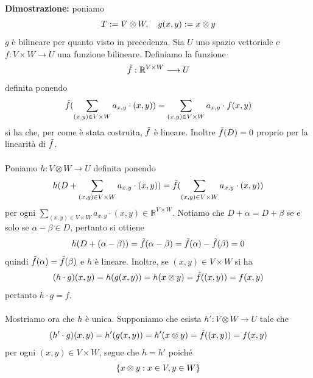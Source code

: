 \documentclass{article}
\begin{document}
\textbf{Dimostrazione:} poniamo
\begin{gather}
    T := V \otimes W, \quad g(x, y) := x \otimes y \notag
\end{gather}
$g$ è bilineare per quanto visto in precedenza. Sia $U$ uno spazio vettoriale e $f : V \times W \longrightarrow U$ una funzione bilineare. Definiamo la funzione
\begin{gather}
    \Tilde{f} : \mathbb{R}^{V \times W} \longrightarrow U \notag
\end{gather}
definita ponendo
\begin{gather}
    \Tilde{f}(\sum_{(x, y) \in V \times W} a_{x, y} \cdot (x, y)) = \sum_{(x, y) \in V \times W} a_{x, y} \cdot f(x, y) \notag
\end{gather}
si ha che, per come è stata costruita, $\Tilde{f}$ è lineare. Inoltre $\Tilde{f}(D) = 0$ proprio per la linearità di $\Tilde{f}$. \\ \\
Poniamo $h : V \otimes W \longrightarrow U$ definita ponendo
\begin{gather}
    h(D + \sum_{(x, y) \in V \times W} a_{x, y} \cdot (x, y)) = \Tilde{f}(\sum_{(x, y) \in V \times W} a_{x, y} \cdot (x, y)) \notag
\end{gather}
per ogni $\sum_{(x, y) \in V \times W} a_{x, y} \cdot (x, y) \in \mathbb{R}^{V \times W}$. Notiamo che $D + \alpha = D + \beta$ se e solo se $\alpha - \beta \in D$, pertanto si ottiene
\begin{gather}
    h(D + (\alpha - \beta)) = \Tilde{f}(\alpha - \beta) = \Tilde{f}(\alpha) - \Tilde{f}(\beta) = 0 \notag
\end{gather}
quindi $\Tilde{f}(\alpha) = \Tilde{f}(\beta)$ e $h$ è lineare. Inoltre, se $(x, y) \in V \times W$ si ha
\begin{gather}
    (h \cdot g)(x, y) = h(g(x, y)) = h(x \otimes y) = \Tilde{f}((x, y)) = f(x, y) \notag
\end{gather}
pertanto $h \cdot g = f$. \\ \\
Mostriamo ora che $h$ è unica. Supponiamo che esista $h' : V \otimes W \longrightarrow U$ tale che
\begin{gather}
    (h' \cdot g)(x, y) = h'(g(x, y)) = h'(x \otimes y) = \Tilde{f}((x, y)) = f(x, y) \notag
\end{gather}
per ogni $(x, y) \in V \times W$, segue che $h = h'$ poiché
\begin{gather}
    \{ x \otimes y : x \in V, y \in W \} \notag
\end{gather}
\end{document}
